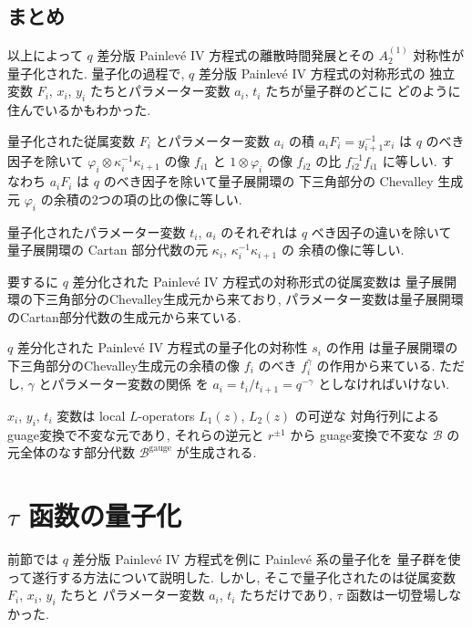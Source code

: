 \documentclass[12pt,twoside,dvipdfm]{msjproc}
\theoremstyle{definition} %
\theoremstyle{definition} %
\theoremstyle{definition} %
\numberwithin{theorem}{section}
\numberwithin{equation}{section}
\numberwithin{figure}{section}
\numberwithin{table}{section}
\newcommand\B{\mathcal{B}}
\newcommand\gauge{{\mathrm{gauge}}}
\begin{document}
\subsection{まとめ}

以上によって $q$ 差分版 Painlev\'e IV 方程式の離散時間発展とその $A^{(1)}_2$ 対称性が
量子化された.  量子化の過程で, $q$ 差分版 Painlev\'e IV 方程式の対称形式の
独立変数 $F_i$, $x_i$, $y_i$ たちとパラメーター変数 $a_i$, $t_i$ たちが量子群のどこに
どのように住んでいるかもわかった.

量子化された従属変数 $F_i$ とパラメーター変数 $a_i$ の積 $a_i F_i = y_{i+1}^{-1}x_i$ 
は $q$ のべき因子を除いて $\varphi_i\otimes\kappa_i^{-1}\kappa_{i+1}$ の像 $f_{i1}$ 
と $1\otimes \varphi_i$ の像 $f_{i2}$ の比 $f_{i2}^{-1}f_{i1}$ に等しい. 
すなわち $a_i F_i$ は $q$ のべき因子を除いて量子展開環の
下三角部分の Chevalley 生成元 $\varphi_i$ の余積の2つの項の比の像に等しい.

量子化されたパラメーター変数 $t_i$, $a_i$ のそれぞれは $q$ べき因子の違いを除いて
量子展開環の Cartan 部分代数の元 $\kappa_i$, $\kappa_i^{-1}\kappa_{i+1}$ の
余積の像に等しい.

要するに $q$ 差分化された Painlev\'e IV 方程式の対称形式の従属変数は
量子展開環の下三角部分のChevalley生成元から来ており,
パラメーター変数は量子展開環のCartan部分代数の生成元から来ている.

$q$ 差分化された Painlev\'e IV 方程式の量子化の対称性 $s_i$ の作用
は量子展開環の下三角部分のChevalley生成元の余積の像 $f_i$ のべき $f_i^\gamma$
の作用から来ている. ただし, $\gamma$ とパラメーター変数の関係
を $a_i=t_i/t_{i+1}=q^{-\gamma}$ としなければいけない.

$x_i$, $y_i$, $t_i$ 変数は local $L$-operators $L_1(z)$, $L_2(z)$ の可逆な
対角行列によるguage変換で不変な元であり, それらの逆元と $r^{\pm1}$ から
guage変換で不変な $\B$ の元全体のなす部分代数 $\B^\gauge$ が生成される.





\section{$\tau$ 函数の量子化}

前節では $q$ 差分版 Painlev\'e IV 方程式を例に Painlev\'e 系の量子化を
量子群を使って遂行する方法について説明した.
しかし, そこで量子化されたのは従属変数 $F_i$, $x_i$, $y_i$ たちと
パラメーター変数 $a_i$, $t_i$ たちだけであり, 
$\tau$ 函数は一切登場しなかった.
\end{document}
